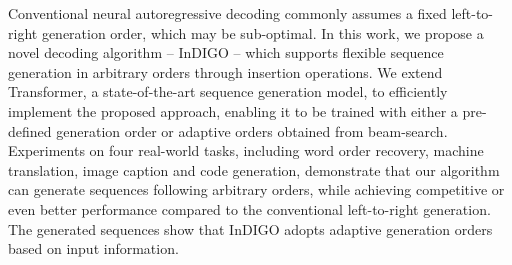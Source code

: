 Conventional neural autoregressive decoding commonly assumes a fixed left-to-right generation order, which may be sub-optimal. In this work, we propose a novel decoding algorithm -- InDIGO -- which supports flexible sequence generation in arbitrary orders through insertion operations. We extend Transformer, a state-of-the-art sequence generation model, to efficiently implement the proposed approach, enabling it to be trained with either a pre-defined generation order or adaptive orders obtained from beam-search. Experiments on four real-world tasks, including word order recovery, machine translation, image caption and code generation, demonstrate that our algorithm can generate sequences following arbitrary orders, while achieving competitive or even better performance compared to the conventional left-to-right generation. The generated sequences show that InDIGO adopts adaptive generation orders based on input information.